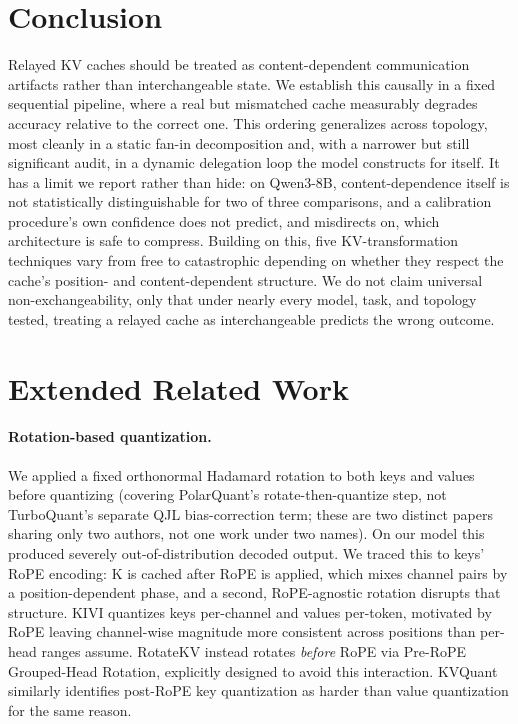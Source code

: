 \documentclass[11pt]{article}
\begin{document}
\section{Conclusion}

Relayed KV caches should be treated as content-dependent communication
artifacts rather than interchangeable state. We establish this causally
in a fixed sequential pipeline, where a real but mismatched cache
measurably degrades accuracy relative to the correct one. This ordering
generalizes across topology, most cleanly in a static fan-in
decomposition and, with a narrower but still significant audit, in a
dynamic delegation loop the model constructs for itself. It has a
limit we report rather than hide: on Qwen3-8B, content-dependence
itself is not statistically distinguishable for two of three
comparisons, and a calibration procedure's own confidence does not
predict, and misdirects on, which architecture is safe to compress.
Building on this, five KV-transformation techniques vary from free to
catastrophic depending on whether they respect the cache's
position- and content-dependent structure. We do not claim universal
non-exchangeability, only that under nearly every model, task, and
topology tested, treating a relayed cache as interchangeable predicts
the wrong outcome.




\appendix

\section{Extended Related Work}
\label{app:relwork}

\paragraph{Rotation-based quantization.}
\label{app:rotation}
We applied a fixed orthonormal
Hadamard rotation to both keys and values before quantizing
(covering PolarQuant's \citep{polarquant2026} rotate-then-quantize
step, not TurboQuant's \citep{turboquant2026} separate QJL
bias-correction term; these are two distinct papers sharing only two
authors, not one work under two names). On our model this produced
severely out-of-distribution decoded output. We traced this to keys'
RoPE encoding: K is cached after RoPE is applied, which mixes channel
pairs by a position-dependent phase, and a second, RoPE-agnostic
rotation disrupts that structure. KIVI \citep{kivi2024} quantizes keys
per-channel and values per-token, motivated by RoPE leaving channel-wise
magnitude more consistent across positions than per-head ranges assume.
RotateKV \citep{rotatekv2025} instead rotates \emph{before} RoPE via
Pre-RoPE Grouped-Head Rotation, explicitly designed to avoid this
interaction. KVQuant \citep{kvquant2024} similarly identifies post-RoPE
key quantization as harder than value quantization for the same reason.
\end{document}

